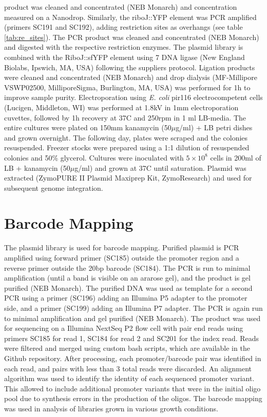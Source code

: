 product was cleaned and concentrated (NEB Monarch) and concentration measured on a Nanodrop. Similarly, the riboJ::YFP element was PCR amplified (primers SC191 and SC192), adding restriction sites as overhangs (see table \ref{tab:re_sites}). The PCR product was cleaned and concentrated (NEB Monarch) and digested with the respective restriction enzymes. The plasmid library is combined with the RiboJ::sfYFP element using 7 DNA ligase (New England Biolabs, Ipswich, MA, USA) following the suppliers protocol. Ligation products were cleaned and concentrated (NEB Monarch) and drop dialysis (MF-Millipore VSWP02500, MilliporeSigma, Burlington, MA, USA)  was performed for 1h to improve sample purity. Electroporation using \textit{E. coli} pir116 electrocompetent cells (Lucigen, Middleton, WI) was performed at 1.8kV in 1mm electroporation cuvettes, followed by 1h recovery at 37C and 250rpm in 1 ml LB-media. The entire cultures were plated on 150mm kanamycin (50$\mu$g/ml) + LB petri dishes and grown overnight. The following day, plates were scraped and the colonies resuspended. Freezer stocks were prepared using a 1:1 dilution of resuspended colonies and 50\% glycerol. Cultures were inoculated with $5\times 10^8$ cells in 200ml of LB + kanamycin (50$\mu$g/ml) and grown at 37C until saturation. Plasmid was extracted (ZymoPURE II Plasmid Maxiprep Kit, ZymoResearch) and used for subsequent genome integration. 


\section{Barcode Mapping}
\label{sec:barcode_mapping}
The plasmid library is used for barcode mapping. Purified plasmid is PCR amplified using forward primer (SC185) outside the promoter region and a reverse primer outside the 20bp barcode (SC184). The PCR is run to minimal amplification (until a band is visible on an ararose gel), and the product is gel purified (NEB Monarch). The purified DNA was used as template for a second PCR using a primer (SC196) adding an Illumina P5 adapter to the promoter side, and a primer (SC199) adding an Illumina P7 adapter. The PCR is again run to minimal amplification and gel purified (NEB Monarch). The product was used for sequencing on a Illumina NextSeq P2 flow cell with pair end reads using primers SC185 for read 1, SC184 for read 2 and SC201 for the index read. Reads were filtered and merged using custom bash scripts, which are available in the Github repository. After processing, each promoter/barcode pair was identified in each read, and pairs with less than 3 total reads were discarded. An alignment algorithm was used to identify the identity of each sequenced promoter variant. This allowed to include additional promoter variants that were in the initial oligo pool due to synthesis errors in the production of the oligos. The barcode mapping was used in analysis of libraries grown in various growth conditions. 

